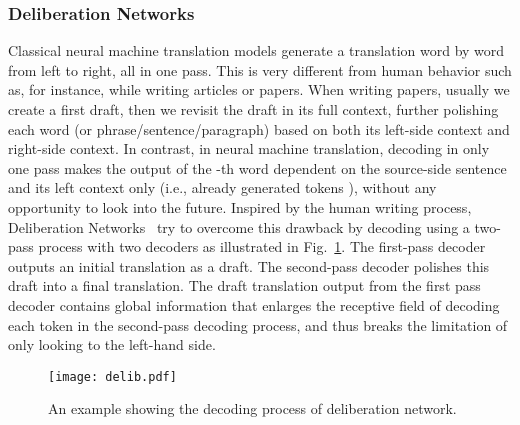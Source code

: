 \documentclass[a4paper]{article}
\begin{document}
\begin{CJK*}{UTF8}{gbsn}
\subsubsection{Deliberation Networks}
\label{sec.dn}
Classical neural machine translation models generate a translation word by word from left to right, all in one pass. This is very different from human behavior such as, for instance, while writing articles or papers. When writing papers, usually we create a first draft, then we revisit the draft in its full context, further polishing each word (or phrase/sentence/paragraph) based on both its left-side context and right-side context. In contrast, in neural machine translation, decoding in only one pass makes the output of the -th word  dependent on the source-side sentence  and its left context only (i.e., already generated tokens ), without any opportunity to look into the future. Inspired by the human writing process, Deliberation Networks~\cite{delibnet} try to overcome this drawback by decoding using a two-pass process with two decoders as illustrated in Fig.~\ref{fig:delib}. The first-pass decoder outputs an initial translation as a draft. The second-pass decoder polishes this draft into a final translation. The draft translation output from the first pass decoder contains global information that enlarges the receptive field of decoding each token  in the second-pass decoding process, and thus breaks the limitation of only looking to the left-hand side. 

\begin{figure}[!htpb]
                \centering
                \texttt{[image: delib.pdf]}
                \caption{An example showing the decoding process of deliberation network.}
                \label{fig:delib}
\end{figure}


\end{CJK*}
\end{document}
